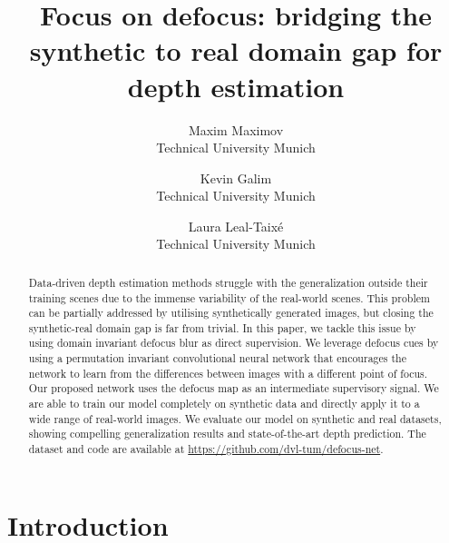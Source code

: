 \documentclass[10pt,twocolumn,letterpaper]{article}
\begin{document}
\title{Focus on defocus: bridging the synthetic to real domain gap for depth estimation}

\author{Maxim Maximov \\
    Technical University Munich\\
    \and
    Kevin Galim\\
    Technical University Munich\\
    \and
    Laura Leal-Taix\'{e}\\
    Technical University Munich\\
}

\maketitle
\thispagestyle{empty}

\begin{abstract}
   Data-driven depth estimation methods struggle with the generalization outside their training scenes due to the immense variability of the real-world scenes. This problem can be partially addressed by utilising synthetically generated images, but closing the synthetic-real domain gap is far from trivial.  
In this paper, we tackle this issue by using domain invariant defocus blur as direct supervision.
We leverage defocus cues by using a permutation invariant convolutional neural network that encourages the network to learn from the differences between images with a different point of focus. 
   Our proposed network uses the defocus map as an intermediate supervisory signal. 
  We are able to train our model completely on synthetic data and directly apply it to a wide range of real-world images. 
   We evaluate our model on synthetic and real datasets, showing compelling generalization results and state-of-the-art depth prediction.
The dataset and code are available at \url{https://github.com/dvl-tum/defocus-net}.
\end{abstract}


\section{Introduction}
\end{document}
